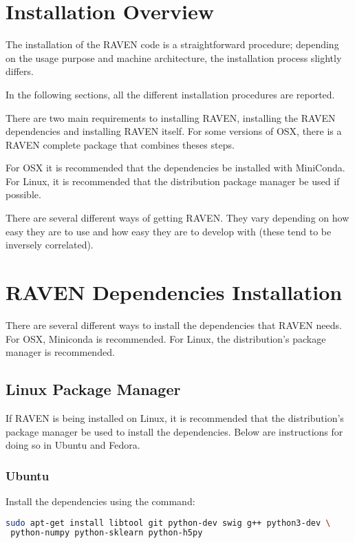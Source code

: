 \section{Installation Overview}

The installation of the RAVEN code is a straightforward procedure;
depending on the usage purpose and machine architecture, the
installation process slightly differs.

In the following sections, all the different installation procedures
are reported.

There are two main requirements to installing RAVEN, installing the
RAVEN dependencies and installing RAVEN itself.  For some versions of
OSX, there is a RAVEN complete package that combines theses steps.

For OSX it is recommended that the dependencies be installed with
MiniConda.  For Linux, it is recommended that the distribution package
manager be used if possible.

There are several different ways of getting RAVEN.  They vary
depending on how easy they are to use and how easy they are to develop
with (these tend to be inversely correlated).

\section{RAVEN Dependencies Installation}

There are several different ways to install the dependencies that
RAVEN needs.  For OSX, Miniconda is recommended.  For Linux, the
distribution's package manager is recommended.

\subsection{Linux Package Manager}

If RAVEN is being installed on Linux, it is recommended that the
distribution's package manager be used to install the dependencies.
Below are instructions for doing so in Ubuntu and Fedora.

\subsubsection{Ubuntu}

Install the dependencies using the command:

\begin{lstlisting}[language=bash]
sudo apt-get install libtool git python-dev swig g++ python3-dev \
 python-numpy python-sklearn python-h5py
\end{lstlisting}

